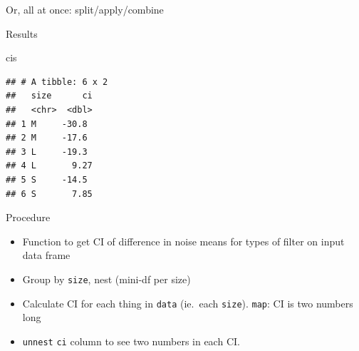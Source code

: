 \documentclass[ignorenonframetext,]{beamer}
\newenvironment{Shaded}{\begin{snugshade}}{\end{snugshade}}
\newcommand{\ControlFlowTok}[1]{\textcolor[rgb]{0.13,0.29,0.53}{\textbf{#1}}}
\newcommand{\DataTypeTok}[1]{\textcolor[rgb]{0.13,0.29,0.53}{#1}}
\newcommand{\KeywordTok}[1]{\textcolor[rgb]{0.13,0.29,0.53}{\textbf{#1}}}
\newcommand{\NormalTok}[1]{#1}
\newcommand{\OperatorTok}[1]{\textcolor[rgb]{0.81,0.36,0.00}{\textbf{#1}}}
\newcommand{\StringTok}[1]{\textcolor[rgb]{0.31,0.60,0.02}{#1}}
\begin{document}
\begin{frame}[fragile]{Or, all at once: split/apply/combine}
\protect\hypertarget{or-all-at-once-splitapplycombine}{}

\scriptsize

\begin{Shaded}
\end{Shaded}

\normalsize

\end{frame}

\begin{frame}[fragile]{Results}
\protect\hypertarget{results}{}

\begin{Shaded}
\begin{Highlighting}[]
\NormalTok{cis}
\end{Highlighting}
\end{Shaded}

\begin{verbatim}
## # A tibble: 6 x 2
##   size      ci
##   <chr>  <dbl>
## 1 M     -30.8 
## 2 M     -17.6 
## 3 L     -19.3 
## 4 L       9.27
## 5 S     -14.5 
## 6 S       7.85
\end{verbatim}

\end{frame}

\begin{frame}[fragile]{Procedure}
\protect\hypertarget{procedure}{}

\begin{itemize}
\item
  Function to get CI of difference in noise means for types of filter on
  input data frame
\item
  Group by \texttt{size}, nest (mini-df per size)
\item
  Calculate CI for each thing in \texttt{data} (ie.~each \texttt{size}).
  \texttt{map}: CI is two numbers long
\item
  \texttt{unnest} \texttt{ci} column to see two numbers in each CI.
\end{itemize}

\end{frame}
\end{document}
